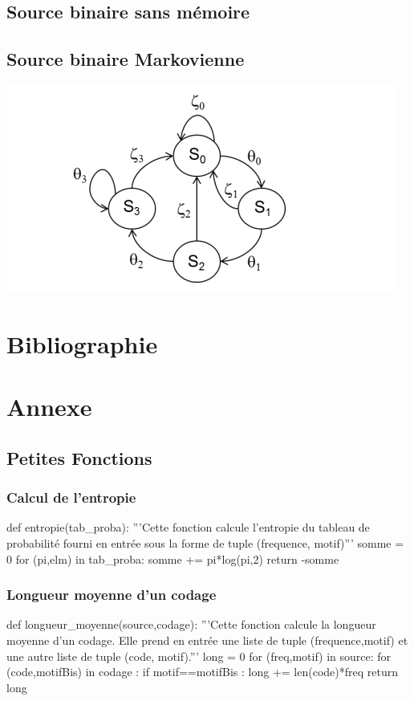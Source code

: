 \documentclass[a4paper,12pt,french]{article}
\begin{document}
	\subsection{Source binaire sans mémoire}
	
	\subsection{Source binaire Markovienne}
	\includegraphics[scale=1]{SourceAvecMemoire.png}
	
\section{Bibliographie}
 	
\section{Annexe}	
	\subsection{Petites Fonctions}
		\subsubsection{Calcul de l'entropie}
		\begin{code}
		def entropie(tab_proba):
    '''Cette fonction calcule l'entropie du tableau de probabilité fourni en entrée sous la forme de tuple (frequence, motif)'''
    somme = 0
    for (pi,elm) in tab_proba:
        somme += pi*log(pi,2)
    return -somme
		\end{code}
		\subsubsection{Longueur moyenne d'un codage}
		\begin{code}
		def longueur_moyenne(source,codage):
    '''Cette fonction calcule la longueur moyenne d'un codage. Elle prend en entrée une liste de tuple (frequence,motif) et une autre liste de tuple (code, motif).'''
    long = 0
    for (freq,motif) in source:
        for (code,motifBis) in codage :
            if motif==motifBis :
                long += len(code)*freq
    return long
    \end{code}
\end{document}
